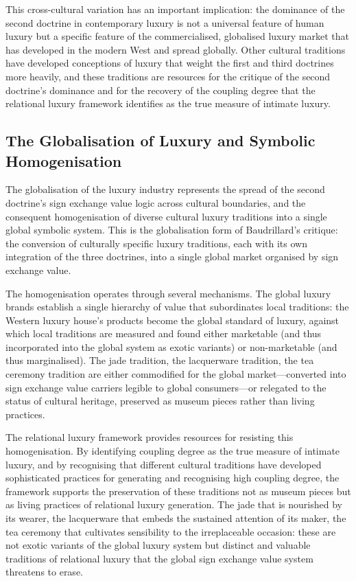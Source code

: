 This cross-cultural variation has an important implication: the dominance of the second doctrine in contemporary luxury is not a universal feature of human luxury but a specific feature of the commercialised, globalised luxury market that has developed in the modern West and spread globally. Other cultural traditions have developed conceptions of luxury that weight the first and third doctrines more heavily, and these traditions are resources for the critique of the second doctrine's dominance and for the recovery of the coupling degree that the relational luxury framework identifies as the true measure of intimate luxury.

\subsection{The Globalisation of Luxury and Symbolic Homogenisation}
\label{p16:subsec:globalisation}

\noindent
The globalisation of the luxury industry represents the spread of the second doctrine's sign exchange value logic across cultural boundaries, and the consequent homogenisation of diverse cultural luxury traditions into a single global symbolic system. This is the globalisation form of Baudrillard's critique: the conversion of culturally specific luxury traditions, each with its own integration of the three doctrines, into a single global market organised by sign exchange value.

The homogenisation operates through several mechanisms. The global luxury brands establish a single hierarchy of value that subordinates local traditions: the Western luxury house's products become the global standard of luxury, against which local traditions are measured and found either marketable (and thus incorporated into the global system as exotic variants) or non-marketable (and thus marginalised). The jade tradition, the lacquerware tradition, the tea ceremony tradition are either commodified for the global market---converted into sign exchange value carriers legible to global consumers---or relegated to the status of cultural heritage, preserved as museum pieces rather than living practices.

The relational luxury framework provides resources for resisting this homogenisation. By identifying coupling degree as the true measure of intimate luxury, and by recognising that different cultural traditions have developed sophisticated practices for generating and recognising high coupling degree, the framework supports the preservation of these traditions not as museum pieces but as living practices of relational luxury generation. The jade that is nourished by its wearer, the lacquerware that embeds the sustained attention of its maker, the tea ceremony that cultivates sensibility to the irreplaceable occasion: these are not exotic variants of the global luxury system but distinct and valuable traditions of relational luxury that the global sign exchange value system threatens to erase.

